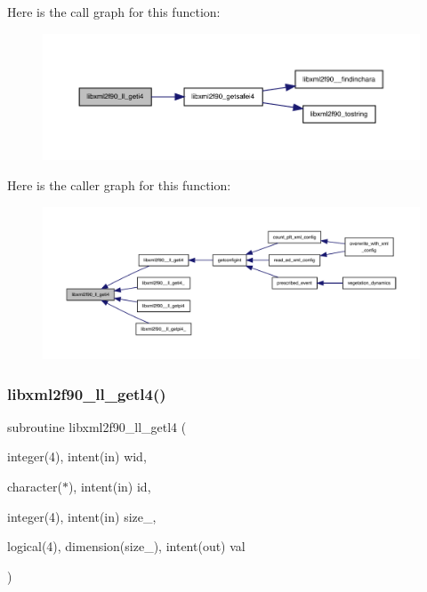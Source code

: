 Here is the call graph for this function\+:
\nopagebreak
\begin{figure}[H]
\begin{center}
\leavevmode
\includegraphics[width=350pt]{libxml2f90_8f90__pp_8f90_a06d3fe6d9c7cd1a6044e617b8a2acdb9_cgraph}
\end{center}
\end{figure}
Here is the caller graph for this function\+:
\nopagebreak
\begin{figure}[H]
\begin{center}
\leavevmode
\includegraphics[width=350pt]{libxml2f90_8f90__pp_8f90_a06d3fe6d9c7cd1a6044e617b8a2acdb9_icgraph}
\end{center}
\end{figure}
\mbox{\label{libxml2f90_8f90__pp_8f90_a71e6fc3f5a24b380986614bd6ff2ca9a}} 
\subsubsection{\texorpdfstring{libxml2f90\+\_\+ll\+\_\+getl4()}{libxml2f90\_ll\_getl4()}}
{\footnotesize\ttfamily subroutine libxml2f90\+\_\+ll\+\_\+getl4 (\begin{DoxyParamCaption}\item[{integer(4), intent(in)}]{wid,  }\item[{character($\ast$), intent(in)}]{id,  }\item[{integer(4), intent(in)}]{size\+\_\+,  }\item[{logical(4), dimension(size\+\_\+), intent(out)}]{val }\end{DoxyParamCaption})}

